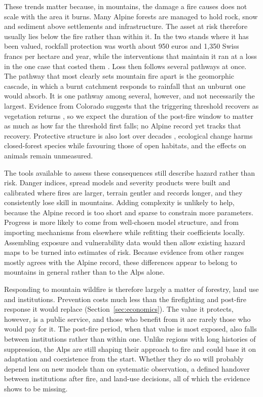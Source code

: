 \documentclass[11pt,a4paper]{article}
\begin{document}
These trends matter because, in mountains, the damage a fire causes does not scale with the area it burns. Many Alpine forests are managed to hold rock, snow and sediment above settlements and infrastructure. The asset at risk therefore usually lies below the fire rather than within it. In the two stands where it has been valued, rockfall protection was worth about 950 euros and 1{,}350 Swiss francs per hectare and year, while the interventions that maintain it ran at a loss in the one case that costed them \citep{accastello_asforesee_2019, moos_climate_2021}. Loss then follows several pathways at once. The pathway that most clearly sets mountain fire apart is the geomorphic cascade, in which a burnt catchment responds to rainfall that an unburnt one would absorb. It is one pathway among several, however, and not necessarily the largest. Evidence from Colorado suggests that the triggering threshold recovers as vegetation returns \citep{rengers_evaluating_2024}, so we expect the duration of the post-fire window to matter as much as how far the threshold first falls; no Alpine record yet tracks that recovery. Protective structure is also lost over decades \citep{gehring_shallow_2019}, ecological change harms closed-forest species while favouring those of open habitats, and the effects on animals remain unmeasured.

The tools available to assess these consequences still describe hazard rather than risk. Danger indices, spread models and severity products were built and calibrated where fires are larger, terrain gentler and records longer, and they consistently lose skill in mountains. Adding complexity is unlikely to help, because the Alpine record is too short and sparse to constrain more parameters. Progress is more likely to come from well-chosen model structure, and from importing mechanisms from elsewhere while refitting their coefficients locally. Assembling exposure and vulnerability data would then allow existing hazard maps to be turned into estimates of risk. Because evidence from other ranges mostly agrees with the Alpine record, these differences appear to belong to mountains in general rather than to the Alps alone.

Responding to mountain wildfire is therefore largely a matter of forestry, land use and institutions. Prevention costs much less than the firefighting and post-fire response it would replace (Section~\ref{sec:economics}). The value it protects, however, is a public service, and those who benefit from it are rarely those who would pay for it. The post-fire period, when that value is most exposed, also falls between institutions rather than within one. Unlike regions with long histories of suppression, the Alps are still shaping their approach to fire and could base it on adaptation and coexistence from the start. Whether they do so will probably depend less on new models than on systematic observation, a defined handover between institutions after fire, and land-use decisions, all of which the evidence shows to be missing.
\end{document}
